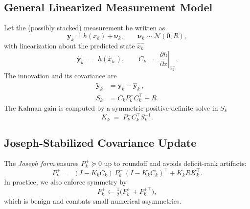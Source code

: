 \documentclass[10pt]{extarticle}
\begin{document}
\subsection{General Linearized Measurement Model}
Let the (possibly stacked) measurement be written as
\begin{equation}
\bm y_k = h(x_k) + \bm \nu_k,\qquad \bm \nu_k \sim \mathcal{N}(0,R),
\label{eq:meas-gen}
\end{equation}
with linearization about the predicted state $\hat x_k^-$
\begin{equation}
\hat{\bm y}_k^- \;=\; h(\hat x_k^-),\qquad
C_k \;=\; \left.\frac{\partial h}{\partial x}\right|_{\hat x_k^-}.
\label{eq:meas-linearization}
\end{equation}
The innovation and its covariance are
\begin{align}
\tilde{\bm y}_k &= \bm y_k - \hat{\bm y}_k^-,
\label{eq:innovation}\\
S_k &= C_k P_k^- C_k^\top + R.
\label{eq:innovation-cov}
\end{align}
The Kalman gain is computed by a symmetric positive-definite solve in $S_k$
\begin{equation}
K_k \;=\; P_k^- C_k^\top S_k^{-1}.
\label{eq:kalman-gain}
\end{equation}

\subsection{Joseph-Stabilized Covariance Update}
The \emph{Joseph form} ensures $P_k^+\succeq 0$ up to roundoff and avoids deficit-rank artifacts:
\begin{equation}
P_k^+ \;=\; (I - K_k C_k)\,P_k^-\, (I - K_k C_k)^\top + K_k R K_k^\top.
\label{eq:joseph}
\end{equation}
In practice, we also enforce symmetry by
\begin{equation}
P_k^+ \leftarrow \tfrac{1}{2}\big(P_k^+ + P_k^{+\top}\big),
\label{eq:symmetrize}
\end{equation}
which is benign and combats small numerical asymmetries.
\end{document}
